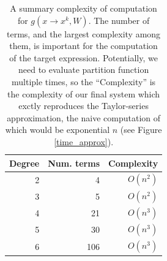 \begin{table}
\tiny
\centering
\begin{tabular}{rrr}
\hline
Degree & Num. terms & Complexity \\
\hline
2 & 4 & $O(n^2)$\\
3 & 5 & $O(n^2)$\\
4 & 21 & $O(n^3)$\\
5 & 30 & $O(n^3)$\\
6 & 106 & $O(n^3)$\\
\hline
\end{tabular}
\caption{A summary complexity of computation for $g(x \rightarrow x^k, W)$. 
  The number of terms, and the largest complexity among them, is important for the computation of the target expression.
  Potentially, we need to evaluate partition function multiple times, so the ``Complexity''
  is the complexity of our final system which exctly reproduces the
  Taylor-series approximation, the naive computation of which would be
  exponential $n$ (see Figure \ref{time_approx}).} 
\label{eval}
\vspace{-4mm}
\end{table}


